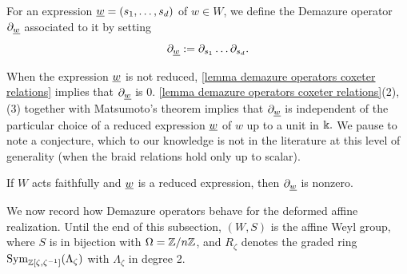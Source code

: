 \begin{definition}\label{defn-demazure operator associated to an expression}
For an expression $\underline{w}=(s_1,\ldots, s_d)$ of $w\in W$, we define the Demazure operator $\partial_{\underline{w}}$ associated to it by setting
$$\partial_{\underline{w}}:= \partial_{s_1}\ldots \partial_{s_d}.$$
\end{definition}
When the expression $\underline{w}$ is not reduced, \cref{lemma demazure operators coxeter relations} implies that $\partial_{\underline{w}}$ is 0. \cref{lemma demazure operators coxeter relations}(2),(3)  together with Matsumoto's theorem implies that  $\partial_{\underline{w}}$ is independent of the particular choice of a reduced expression $\underline{w}$ of $w$ up to a unit in $\Bbbk.$ We pause to note a conjecture, which to our knowledge is not in the literature at this level of generality (when the braid relations hold only up to scalar).

\begin{conjecture} If $W$ acts faithfully and $\underline{w}$ is a reduced expression, then $\partial_{\underline{w}}$ is nonzero. \end{conjecture}

We now record how Demazure operators behave for the deformed affine realization. Until the end of this subsection, $(W,S)$ is the affine Weyl group, where $S$ is in bijection with $\Omega = \mathbb{Z}/n\mathbb{Z}$, and $R_{\zeta}$ denotes the graded ring $\operatorname{Sym}_{\mathbb{Z}[\zeta,\zeta^{-1}]}(\Lambda_{\zeta})$ with $\Lambda_{\zeta}$ in degree 2.



